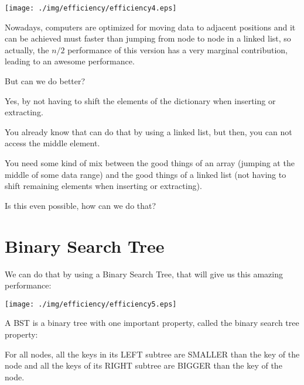 \documentclass[a4paper, 9pt]{extarticle}
\begin{document}

\begin{multicols}{2}
\begin{center}
  \texttt{[image: ./img/efficiency/efficiency4.eps]}
\end{center}
\columnbreak

Nowadays, computers are optimized for moving data to adjacent positions and it
can be achieved must faster than jumping from node to node in a linked list, so
actually, the $n/2$ performance of this version has a very marginal
contribution, leading to an awesome performance.

But can we do better?

Yes, by not having to shift the elements of the dictionary when inserting or
extracting.

You already know that can do that by using a linked list, but then, you can not
access the middle element.

You need some kind of mix between the good things of an array (jumping at the
middle of some data range) and the good things of a linked list (not having to
shift remaining elements when inserting or extracting).

Is this even possible, how can we do that?

\end{multicols}



\newpage

\section{Binary Search Tree}

We can do that by using a Binary Search Tree, that will give us this amazing
performance:

\begin{center}
  \texttt{[image: ./img/efficiency/efficiency5.eps]}
\end{center}

A BST is a binary tree with one important property, called the binary search tree property:

\begin{blackboard}
  For all nodes,
        all the keys in its LEFT  subtree are SMALLER than the key of the node
    and all the keys of its RIGHT subtree are BIGGER  than the key of the node.
\end{blackboard}
\end{document}
